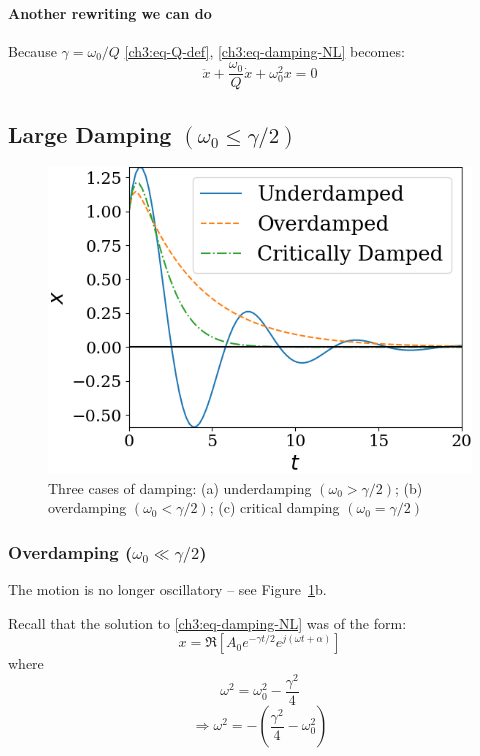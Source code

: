 \paragraph{Another rewriting we can do}
Because $\gamma=\omega_0/Q$ \eqref{ch3:eq-Q-def}, \eqref{ch3:eq-damping-NL} becomes:
\[ \boxed{ \ddot{x} + \frac{\omega_0}{Q}\dot{x} + \omega_0^2 x = 0 } \]


\subsection{Large Damping $(\omega_0 \leq \gamma/2)$}

\begin{figure}[h]
	\centering
	\includegraphics[scale=0.7]{phys232/Ch3-damped-oscillators-graph.png} \caption{Three cases of damping: (a) underdamping $(\omega_0>\gamma/2)$; (b) overdamping $(\omega_0<\gamma/2)$; (c) critical damping $(\omega_0=\gamma/2)$} \label{ch3:fig-damping}
\end{figure}


\subsubsection{Overdamping ($ \omega_0 \ll \gamma/2 $)}
The motion is no longer oscillatory -- see Figure~\ref{ch3:fig-damping}b.

Recall that the solution to \eqref{ch3:eq-damping-NL} was of the form:
\[ 	x = \Re\left[ A_0 e^{-\gamma t/2} e^{j(\omega t+\alpha)} \right] \]
where
\[ \omega^2 = \omega_0^2 - \frac{\gamma^2}{4} \]
\[ \Longrightarrow \omega^2 =  -\left( \frac{\gamma^2}{4} - \omega_0^2 \right)  \]

